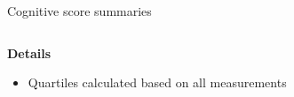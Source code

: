 \begin{frame}{Cognitive score summaries}
\begin{columns}[c]
    \end{columns}

    \textbf{Details}
    \begin{itemize}
        \item Quartiles calculated based on all measurements
    \end{itemize}

\end{frame}

